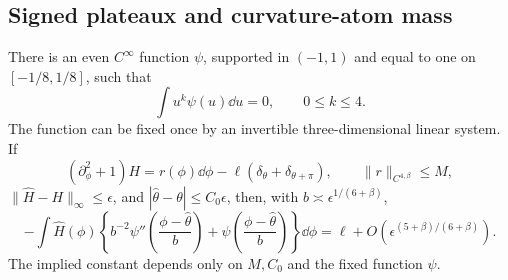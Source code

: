 \subsection{Signed plateaux and curvature-atom mass}
\begin{lemma}
\label{lem:two-field-plateau-details}
There is an even $C^\infty$ function $\psi$, supported in
$(-1,1)$ and equal to one on $[-1/8,1/8]$, such that
\[
             \int u^k\psi(u)\dd u=0,
                         \qquad 0\le k\le4.
\]
The function can be fixed once by an invertible three-dimensional
linear system.  If
\[
 (\partial_\phi^2+1)H
       =r(\phi)\dd\phi-\ell(\delta_\theta+\delta_{\theta+\pi}),
       \qquad \|r\|_{C^{4,\beta}}\le M,
\]
$\|\widehat H-H\|_\infty\le\epsilon$, and
$|\widehat\theta-\theta|\le C_0\epsilon$, then, with
$b\asymp\epsilon^{1/(6+\beta)}$,
\[
 -\int\widehat H(\phi)
   \left\{b^{-2}\psi''\left(\frac{\phi-\widehat\theta}{b}\right)
             +\psi\left(\frac{\phi-\widehat\theta}{b}\right)\right\}
             \dd\phi
       =\ell+O(\epsilon^{(5+\beta)/(6+\beta)}).
\]
The implied constant depends only on $M,C_0$ and the fixed function
$\psi$.
\end{lemma}
